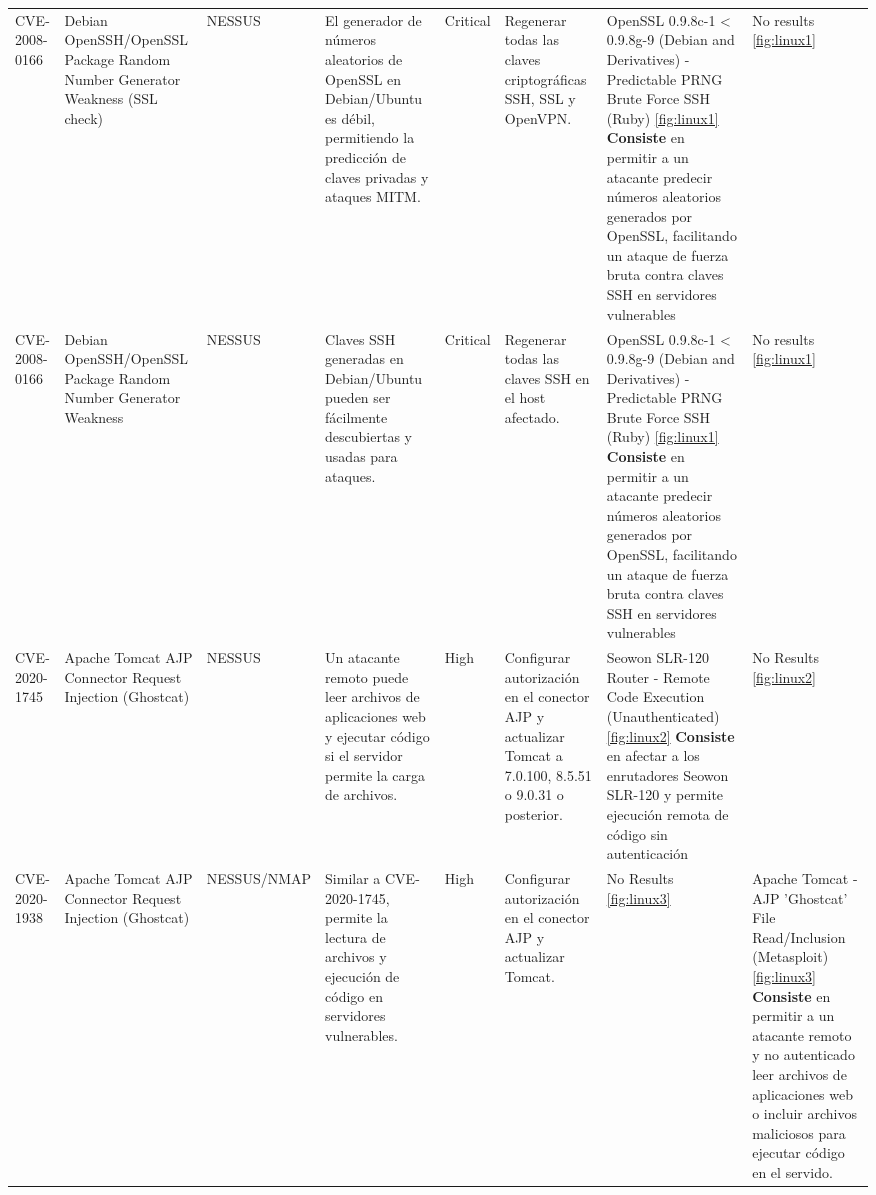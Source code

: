 \documentclass[a4paper,12pt]{article} %
\begin{document}
\begin{table}[hp!]
{\begin{tabular}{m{2.1cm}|m{2.6cm}|m{2cm}|m{4cm}|m{1cm}|m{3cm}|m{5cm}|m{5cm}}
  {CVE-2008-0166} & {Debian OpenSSH/OpenSSL Package Random Number Generator Weakness (SSL check)} & {NESSUS} & {El generador de números aleatorios de OpenSSL en Debian/Ubuntu es débil, permitiendo la predicción de claves privadas y ataques MITM.} & {Critical} & {Regenerar todas las claves criptográficas SSH, SSL y OpenVPN.} & {OpenSSL 0.9.8c-1 < 0.9.8g-9 (Debian and Derivatives) - Predictable PRNG Brute Force SSH (Ruby) \ref{fig:linux1} \vspace{2mm} \hline \vspace{2mm} {\color{blue} \textbf{Consiste}  en permitir a un atacante predecir números aleatorios generados por OpenSSL, facilitando un ataque de fuerza bruta contra claves SSH en servidores vulnerables}} & {No results \ref{fig:linux1}}\\
  {CVE-2008-0166} & {Debian OpenSSH/OpenSSL Package Random Number Generator Weakness} & {NESSUS} & {Claves SSH generadas en Debian/Ubuntu pueden ser fácilmente descubiertas y usadas para ataques.} & {Critical} & {Regenerar todas las claves SSH en el host afectado.} & {OpenSSL 0.9.8c-1 < 0.9.8g-9 (Debian and Derivatives) - Predictable PRNG Brute Force SSH (Ruby) \ref{fig:linux1} \vspace{2mm} \hline \vspace{2mm} {\color{blue} \textbf{Consiste}  en permitir a un atacante predecir números aleatorios generados por OpenSSL, facilitando un ataque de fuerza bruta contra claves SSH en servidores vulnerables}} & {No results \ref{fig:linux1}}\\
  {CVE-2020-1745} & {Apache Tomcat AJP Connector Request Injection (Ghostcat)} & {NESSUS} & {Un atacante remoto puede leer archivos de aplicaciones web y ejecutar código si el servidor permite la carga de archivos.} & {High} & {Configurar autorización en el conector AJP y actualizar Tomcat a 7.0.100, 8.5.51 o 9.0.31 o posterior.} & {Seowon SLR-120 Router - Remote Code Execution (Unauthenticated) \ref{fig:linux2} \vspace{2mm} \hline \vspace{2mm} {\color{blue} \textbf{Consiste} en afectar a los enrutadores Seowon SLR-120 y permite ejecución remota de código sin autenticación }} & {No Results \ref{fig:linux2}}\\
  {CVE-2020-1938} & {Apache Tomcat AJP Connector Request Injection (Ghostcat)} & {NESSUS/NMAP} & {Similar a CVE-2020-1745, permite la lectura de archivos y ejecución de código en servidores vulnerables.} & {High} & {Configurar autorización en el conector AJP y actualizar Tomcat.} & { No Results \ref{fig:linux3}} & { Apache Tomcat - AJP 'Ghostcat' File Read/Inclusion (Metasploit)  \ref{fig:linux3} \vspace{2mm} \hline \vspace{2mm} {\color{blue} \textbf{Consiste} en permitir a un atacante remoto y no autenticado leer archivos de aplicaciones web o incluir archivos maliciosos para ejecutar código en el servido.}}\\

\end{tabular}}
\end{table}
\end{document}
